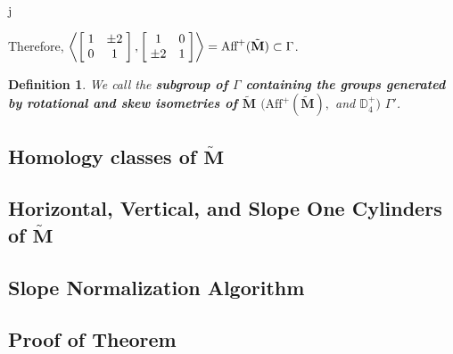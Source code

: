 j\documentclass[]{article}
\newtheorem{Def}{Definition}[subsection]
\begin{document}
Therefore, $\left<\left[ \hspace{1mm} \begin{matrix}
				1 & \pm 2\\
				0 & 1
			\end{matrix}\hspace{1mm}\right], 
			\left[ \hspace{1mm} \begin{matrix}
							1 & 0\\
							\pm 2 & 1
						\end{matrix}\hspace{1mm}\right]\right>=\text{Aff}^{+}(\tilde{\mathbf{M}})\subset\Gamma$.
						
\begin{Def}
We call the \textbf{subgroup of $\Gamma$ containing the groups generated by rotational and skew isometries of $\tilde{\mathbf{M}}$} $(\text{Aff}^{+}(\tilde{\mathbf{M}}),$ and $\mathbb{D}^{+}_4)$ $\Gamma'$.
\end{Def}

\newpage
\subsection{Homology classes of $\tilde{\mathbf{M}}$}

\newpage
\subsection{Horizontal, Vertical, and Slope One Cylinders of $\tilde{\mathbf{M}}$}
\begin{figure}[H]
\centering

\end{figure}
\newpage
\subsection{Slope Normalization Algorithm}

\newpage
\subsection{Proof of Theorem}
\end{document}
